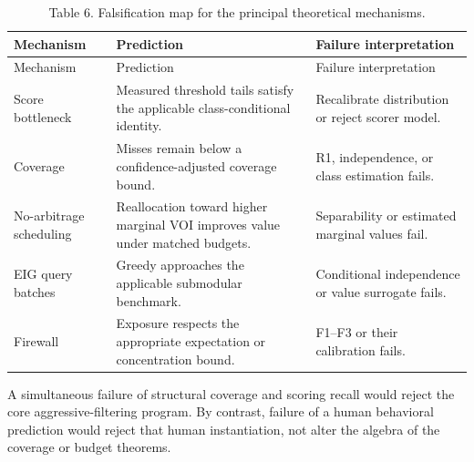 \documentclass[
  11pt]{article}
\begin{document}
\begin{longtable}[]{@{}
  >{\raggedright\arraybackslash}p{}
  >{\raggedright\arraybackslash}p{}
  >{\raggedright\arraybackslash}p{}@{}}
\caption{Table 6. Falsification map for the principal theoretical mechanisms.}\tabularnewline
\toprule\noalign{}
\begin{minipage}[b]{\linewidth}\raggedright
Mechanism
\end{minipage} & \begin{minipage}[b]{\linewidth}\raggedright
Prediction
\end{minipage} & \begin{minipage}[b]{\linewidth}\raggedright
Failure interpretation
\end{minipage} \\
\midrule\noalign{}
\endfirsthead
\toprule\noalign{}
\begin{minipage}[b]{\linewidth}\raggedright
Mechanism
\end{minipage} & \begin{minipage}[b]{\linewidth}\raggedright
Prediction
\end{minipage} & \begin{minipage}[b]{\linewidth}\raggedright
Failure interpretation
\end{minipage} \\
\midrule\noalign{}
\endhead
\bottomrule\noalign{}
\endlastfoot
Score bottleneck & Measured threshold tails satisfy the applicable class-conditional identity. & Recalibrate distribution or reject scorer model. \\
Coverage & Misses remain below a confidence-adjusted coverage bound. & R1, independence, or class estimation fails. \\
No-arbitrage scheduling & Reallocation toward higher marginal VOI improves value under matched budgets. & Separability or estimated marginal values fail. \\
EIG query batches & Greedy approaches the applicable submodular benchmark. & Conditional independence or value surrogate fails. \\
Firewall & Exposure respects the appropriate expectation or concentration bound. & F1--F3 or their calibration fails. \\
\end{longtable}

A simultaneous failure of structural coverage and scoring recall would reject the core aggressive-filtering program. By contrast, failure of a human behavioral prediction would reject that human instantiation, not alter the algebra of the coverage or budget theorems.
\end{document}
